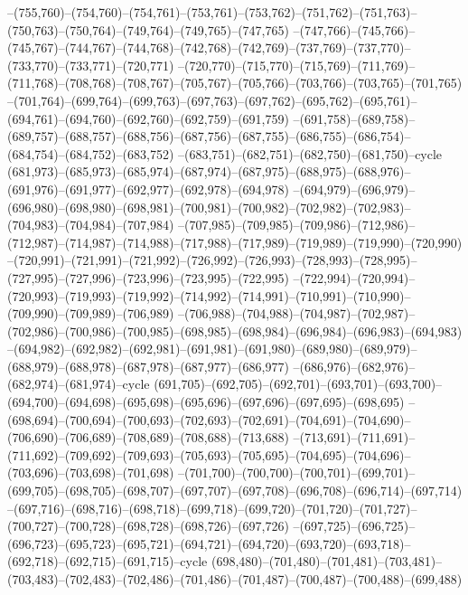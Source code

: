 --(755,760)--(754,760)--(754,761)--(753,761)--(753,762)--(751,762)--(751,763)--(750,763)--(750,764)--(749,764)--(749,765)--(747,765)
--(747,766)--(745,766)--(745,767)--(744,767)--(744,768)--(742,768)--(742,769)--(737,769)--(737,770)--(733,770)--(733,771)--(720,771)
--(720,770)--(715,770)--(715,769)--(711,769)--(711,768)--(708,768)--(708,767)--(705,767)--(705,766)--(703,766)--(703,765)--(701,765)
--(701,764)--(699,764)--(699,763)--(697,763)--(697,762)--(695,762)--(695,761)--(694,761)--(694,760)--(692,760)--(692,759)--(691,759)
--(691,758)--(689,758)--(689,757)--(688,757)--(688,756)--(687,756)--(687,755)--(686,755)--(686,754)--(684,754)--(684,752)--(683,752)
--(683,751)--(682,751)--(682,750)--(681,750)--cycle
(681,973)--(685,973)--(685,974)--(687,974)--(687,975)--(688,975)--(688,976)--(691,976)--(691,977)--(692,977)--(692,978)--(694,978)
--(694,979)--(696,979)--(696,980)--(698,980)--(698,981)--(700,981)--(700,982)--(702,982)--(702,983)--(704,983)--(704,984)--(707,984)
--(707,985)--(709,985)--(709,986)--(712,986)--(712,987)--(714,987)--(714,988)--(717,988)--(717,989)--(719,989)--(719,990)--(720,990)
--(720,991)--(721,991)--(721,992)--(726,992)--(726,993)--(728,993)--(728,995)--(727,995)--(727,996)--(723,996)--(723,995)--(722,995)
--(722,994)--(720,994)--(720,993)--(719,993)--(719,992)--(714,992)--(714,991)--(710,991)--(710,990)--(709,990)--(709,989)--(706,989)
--(706,988)--(704,988)--(704,987)--(702,987)--(702,986)--(700,986)--(700,985)--(698,985)--(698,984)--(696,984)--(696,983)--(694,983)
--(694,982)--(692,982)--(692,981)--(691,981)--(691,980)--(689,980)--(689,979)--(688,979)--(688,978)--(687,978)--(687,977)--(686,977)
--(686,976)--(682,976)--(682,974)--(681,974)--cycle
(691,705)--(692,705)--(692,701)--(693,701)--(693,700)--(694,700)--(694,698)--(695,698)--(695,696)--(697,696)--(697,695)--(698,695)
--(698,694)--(700,694)--(700,693)--(702,693)--(702,691)--(704,691)--(704,690)--(706,690)--(706,689)--(708,689)--(708,688)--(713,688)
--(713,691)--(711,691)--(711,692)--(709,692)--(709,693)--(705,693)--(705,695)--(704,695)--(704,696)--(703,696)--(703,698)--(701,698)
--(701,700)--(700,700)--(700,701)--(699,701)--(699,705)--(698,705)--(698,707)--(697,707)--(697,708)--(696,708)--(696,714)--(697,714)
--(697,716)--(698,716)--(698,718)--(699,718)--(699,720)--(701,720)--(701,727)--(700,727)--(700,728)--(698,728)--(698,726)--(697,726)
--(697,725)--(696,725)--(696,723)--(695,723)--(695,721)--(694,721)--(694,720)--(693,720)--(693,718)--(692,718)--(692,715)--(691,715)--cycle
(698,480)--(701,480)--(701,481)--(703,481)--(703,483)--(702,483)--(702,486)--(701,486)--(701,487)--(700,487)--(700,488)--(699,488)
